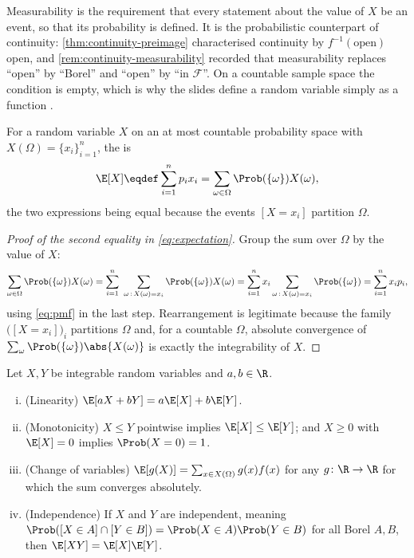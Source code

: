 Measurability is the requirement that every statement about the value of $X$ be
an event, so that its probability is defined. It is the probabilistic
counterpart of continuity: \autoref{thm:continuity-preimage} characterised
continuity by $f^{-1}(\text{open})$ open, and
\autoref{rem:continuity-measurability} recorded that measurability replaces
``open'' by ``Borel'' and ``open'' by ``in $\mathcal{F}$''. On a countable sample space the
condition is empty, which is why the slides define a random variable simply as a
function \autocite[slide 15]{fukuda2026probability}.

\begin{definition}[Expectation]\label{def:expectation}
	For a random variable $X$ on an at most countable probability space with
	$X(\Omega)=\{x_i\}_{i=1}^{n}$, the  is
	\begin{equation}\label{eq:expectation}
		\E[X]\eqdef\sum_{i=1}^{n}p_ix_i
		=\sum_{\omega\in\Omega}\Prob(\{\omega\})X(\omega),
	\end{equation}
	the two expressions being equal because the events $[X=x_i]$ partition $\Omega$.
\end{definition}

\begin{proof}[Proof of the second equality in \eqref{eq:expectation}]
	Group the sum over $\Omega$ by the value of $X$:
	\[
		\sum_{\omega\in\Omega}\Prob(\{\omega\})X(\omega)
		=\sum_{i=1}^{n}\ \sum_{\omega\,:\,X(\omega)=x_i}\Prob(\{\omega\})X(\omega)
		=\sum_{i=1}^{n}x_i\sum_{\omega\,:\,X(\omega)=x_i}\Prob(\{\omega\})
		=\sum_{i=1}^{n}x_ip_i,
	\]
	using \eqref{eq:pmf} in the last step. Rearrangement is legitimate because the
	family $\bigl([X=x_i]\bigr)_{i}$ partitions $\Omega$ and, for a countable
	$\Omega$, absolute convergence of $\sum_{\omega}\Prob(\{\omega\})\abs{X(\omega)}$
	is exactly the integrability of $X$.
\end{proof}

\begin{proposition}\label{prop:expectation-properties}
	Let $X,Y$ be integrable random variables and $a,b\in\R$.
	\begin{enumerate}[(i)]
		\item (Linearity) $\E[aX+bY]=a\E[X]+b\E[Y]$.
		\item (Monotonicity) $X\leq Y$ pointwise implies $\E[X]\leq\E[Y]$; and
		      $X\geq0$ with $\E[X]=0$ implies $\Prob(X=0)=1$.
		\item (Change of variables) $\E[g(X)]=\sum_{x\in X(\Omega)}g(x)f(x)$ for any
		      $g\colon\R\to\R$ for which the sum converges absolutely.
		\item (Independence) If $X$ and $Y$ are independent, meaning
		      $\Prob([X\in A]\cap[Y\in B])=\Prob(X\in A)\Prob(Y\in B)$ for all Borel
		      $A,B$, then $\E[XY]=\E[X]\E[Y]$.
	\end{enumerate}
\end{proposition}

